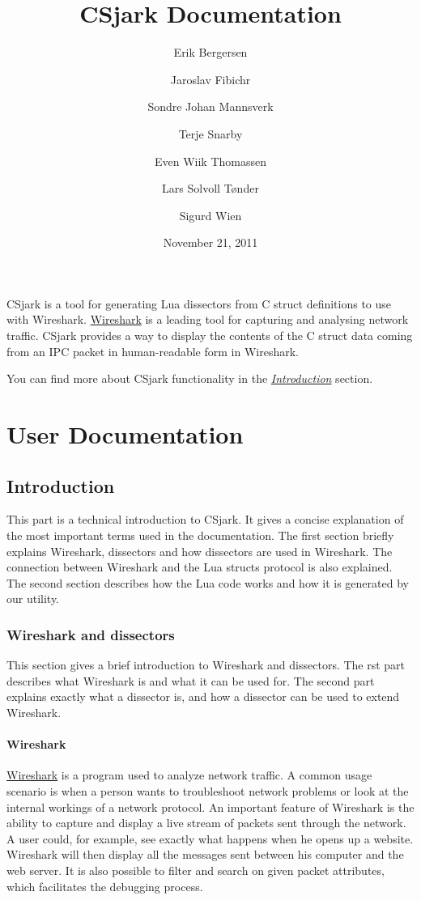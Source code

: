\documentclass[A4paper,10pt,english]{sphinxmanual}
\title{CSjark Documentation}
\date{November 21, 2011}
\author{Erik Bergersen \and Jaroslav Fibichr \and Sondre Johan Mannsverk \and Terje Snarby \and Even Wiik Thomassen \and Lars Solvoll Tønder \and Sigurd Wien}
\begin{document}


CSjark is a tool for generating Lua dissectors from C struct definitions to use with Wireshark. \href{http://www.wireshark.org}{Wireshark} is a leading tool for capturing and analysing network traffic. CSjark provides a way to display the contents of the C struct data coming from an IPC packet in human-readable form in Wireshark.

You can find more about CSjark functionality in the {\hyperref[user/intro:intro]{\emph{Introduction}}} section.


\chapter{User Documentation}
\label{index:user-documentation}\label{index:welcome-to-csjark-s-documentation}

\section{Introduction}
\label{user/intro:introduction}\label{user/intro:intro}\label{user/intro::doc}
This part is a technical introduction to CSjark. It gives a concise explanation of the most important terms used in the documentation.
The first section briefly explains Wireshark, dissectors and how dissectors are used in Wireshark. The connection between Wireshark and the Lua structs protocol is also explained. The second section describes how the Lua code works and how it is generated by our utility.


\subsection{Wireshark and dissectors}
\label{user/intro:wireshark-and-dissectors}
This section gives a brief introduction to Wireshark and dissectors. The
rst part describes what Wireshark is and what it can be used for. The second part explains exactly what a dissector is, and how a dissector can be used to extend Wireshark.


\subsubsection{Wireshark}
\label{user/intro:wireshark}
\href{http://www.wireshark.org}{Wireshark} is a program used to analyze network traffic. A common usage scenario is when a person wants to troubleshoot network problems or look at the internal workings of a network protocol. An important feature of Wireshark is the ability to capture and display a live stream of packets sent through the network. A user could, for example, see exactly what happens when he opens up a website. Wireshark will then display all the messages sent between his computer and the web server. It is also possible to filter and search on given packet attributes, which facilitates the debugging process.
\end{document}
